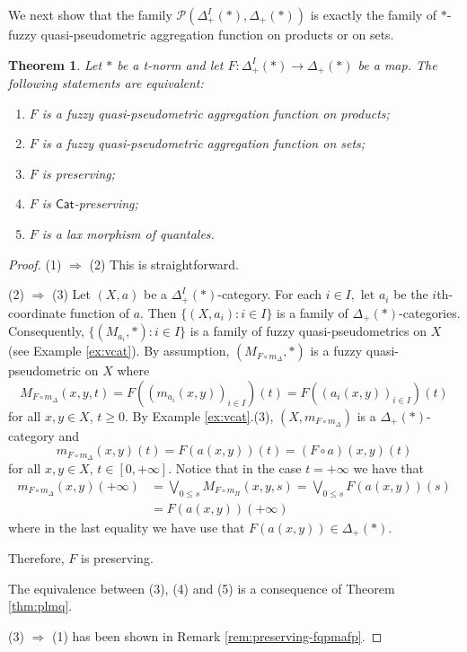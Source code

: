 \documentclass[11pt,a4paper]{amsart}
\newtheorem{theorem}{Theorem}[section]
\theoremstyle{definition}
\begin{document}
	We next show that the family $\mathscr{P}(\Delta_+^I(\ast), \Delta_+(\ast))$ is exactly the family of $\ast$-fuzzy quasi-pseudometric aggregation function on products or on sets.
	
	
	\begin{theorem}\label{thm:fqpmaf}
		Let $\ast$ be a t-norm and let $F:\Delta_+^I(\ast)\to \Delta_+(\ast)$ be a map. The following statements are equivalent:
		\begin{enumerate}[(1)]
			\item $F$ is a fuzzy quasi-pseudometric aggregation function on products;
			\item $F$ is a fuzzy quasi-pseudometric aggregation function on sets;
			\item $F$ is preserving;
			\item $F$ is $\mathsf{Cat}$-preserving;
			\item $F$ is a lax morphism of quantales.
		\end{enumerate}
	\end{theorem}
	
	\begin{proof}
		(1) $\Rightarrow$ (2) This is straightforward.
		
		(2) $\Rightarrow$ (3) Let $(X,a)$ be a $\Delta_+^I(\ast)$-category. For each $i\in I,$ let $a_i$ be the $i$th-coordinate function of $a$. Then $\Big\{(X,a_i):i\in I\Big\}$ is a family of $\Delta_+(\ast)$-categories. Consequently, $\Big\{(M_{a_i},\ast):i\in I\Big\}$ is a family of fuzzy quasi-pseudometrics on $X$ (see Example \ref{ex:vcat}). By assumption, $(M_{F\circ m_\Delta},\ast)$ is a fuzzy quasi-pseudometric on $X$ where  
		$$M_{F\circ m_\Delta}(x,y,t)=F((m_{a_i}(x,y))_{i\in I})(t)=F((a_i(x,y))_{i\in I})(t)$$
		for all $x,y\in X$, $t\geq 0.$ By Example \ref{ex:vcat}.(3), $(X,m_{F\circ m_\Delta})$ is a $\Delta_+(\ast)$-category and 
		$$m_{F\circ m_\Delta}(x,y)(t)=F(a(x,y))(t)=(F\circ a)(x,y)(t)$$
		for all $x,y\in X$, $t\in [0,+\infty].$ Notice that in the case $t=+\infty$ we have that
		\begin{align*}
			m_{F\circ m_\Delta}(x,y)(+\infty)&=\bigvee_{0\leq s} M_{F\circ m_\Pi}(x,y,s)=\bigvee_{0\leq s} F(a(x,y))(s)\\&=F(a(x,y))(+\infty)
		\end{align*}
		where in the last equality we have use that $F(a(x,y))\in \Delta_+(\ast).$ 
		
		Therefore, $F$ is preserving. 
		
		The equivalence between (3), (4) and (5) is a consequence of Theorem \ref{thm:plmq}. 
		
		(3) $\Rightarrow$ (1) has been shown in Remark \ref{rem:preserving-fqpmafp}.
	\end{proof}
	
\end{document}
